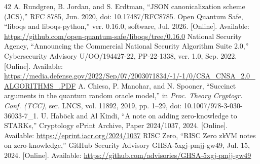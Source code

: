 \begin{thebibliography}{42}
A. Rundgren, B. Jordan, and S. Erdtman, ``JSON canonicalization scheme (JCS),'' RFC 8785, Jun. 2020, doi: 10.17487/RFC8785.
Open Quantum Safe, ``liboqs and liboqs-python,'' ver. 0.16.0, software, Jul. 2026. [Online]. Available: \url{https://github.com/open-quantum-safe/liboqs/tree/0.16.0}
National Security Agency, ``Announcing the Commercial National Security Algorithm Suite 2.0,'' Cybersecurity Advisory U/OO/194427-22, PP-22-1338, ver. 1.0, Sep. 2022. [Online]. Available: \url{https://media.defense.gov/2022/Sep/07/2003071834/-1/-1/0/CSA_CNSA_2.0_ALGORITHMS_.PDF}
A. Chiesa, P. Manohar, and N. Spooner, ``Succinct arguments in the quantum random oracle model,'' in \emph{Proc. Theory Cryptogr. Conf. (TCC)}, ser. LNCS, vol. 11892, 2019, pp. 1--29, doi: 10.1007/978-3-030-36033-7\_1.
U. Hab\"ock and Al Kindi, ``A note on adding zero-knowledge to STARKs,'' Cryptology ePrint Archive, Paper 2024/1037, 2024. [Online]. Available: \url{https://eprint.iacr.org/2024/1037}
RISC Zero, ``RISC Zero zkVM notes on zero-knowledge,'' GitHub Security Advisory GHSA-5xgj-pmjj-gw49, Jul. 15, 2024. [Online]. Available: \url{https://github.com/advisories/GHSA-5xgj-pmjj-gw49}
\end{thebibliography}
